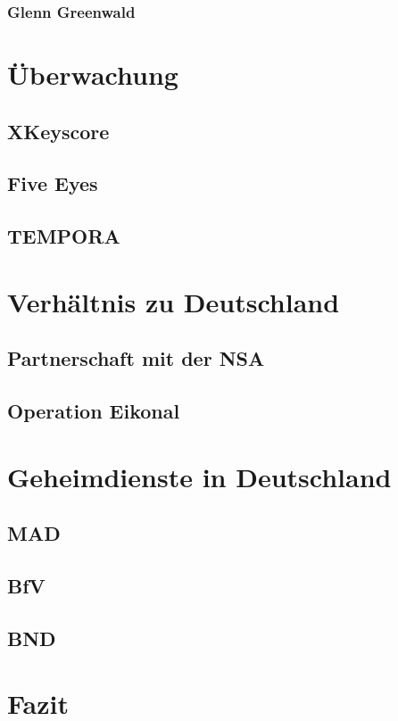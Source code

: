 \documentclass[12pt,a4paper]{scrartcl}
\begin{document}
\subsubsection{Glenn Greenwald}

\section{Überwachung}

\subsection{XKeyscore}


\subsection{Five Eyes}

\subsection{TEMPORA}

\section{Verhältnis zu Deutschland}

\subsection{Partnerschaft mit der NSA}

\subsection{Operation Eikonal}

\section{Geheimdienste in Deutschland}

\subsection{MAD}

\subsection{BfV}

\subsection{BND}

\section{Fazit}

\printbibliography
\end{document}
